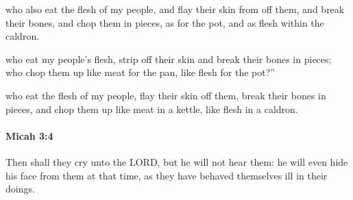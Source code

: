 			\begin{versebox}
					\item[BHS] 
					\item[LXX] 
					\item[ASV] who also eat the flesh of my people, and flay their skin from off them, and break their bones, and chop them in pieces, as for the pot, and as flesh within the caldron.
					\item[NIV] who eat my people’s flesh, strip off their skin and break their bones in pieces; who chop them up like meat for the pan, like flesh for the pot?”
					\item[NRSV] who eat the flesh of my people, flay their skin off them, break their bones in pieces, and chop them up like meat in a kettle, like flesh in a caldron.
			\end{versebox}

		\paragraph{Micah 3:4} %
			\label{MICAH-3-4}

			Then shall they cry unto the LORD, but he will not hear them: he will even hide his face from them at that time, as they have behaved themselves ill in their doings.

